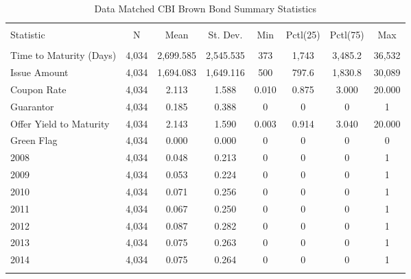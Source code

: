 
\begin{table}[!htbp] \centering 
  \footnotesize
  \caption{Data Matched CBI Brown Bond Summary Statistics} 
  \label{} 
\begin{tabular}{@{\extracolsep{5pt}}lccccccc} 
\\[-1.8ex]\hline 
\hline \\[-1.8ex] 
Statistic & \multicolumn{1}{c}{N} & \multicolumn{1}{c}{Mean} & \multicolumn{1}{c}{St. Dev.} & \multicolumn{1}{c}{Min} & \multicolumn{1}{c}{Pctl(25)} & \multicolumn{1}{c}{Pctl(75)} & \multicolumn{1}{c}{Max} \\ 
\hline \\[-1.8ex] 
Time to Maturity (Days) & 4,034 & 2,699.585 & 2,545.535 & 373 & 1,743 & 3,485.2 & 36,532 \\ 
Issue Amount & 4,034 & 1,694.083 & 1,649.116 & 500 & 797.6 & 1,830.8 & 30,089 \\ 
Coupon Rate & 4,034 & 2.113 & 1.588 & 0.010 & 0.875 & 3.000 & 20.000 \\ 
Guarantor & 4,034 & 0.185 & 0.388 & 0 & 0 & 0 & 1 \\ 
Offer Yield to Maturity & 4,034 & 2.143 & 1.590 & 0.003 & 0.914 & 3.040 & 20.000 \\
Green Flag & 4,034 & 0.000 & 0.000 & 0 & 0 & 0 & 0 \\ 
2008 & 4,034 & 0.048 & 0.213 & 0 & 0 & 0 & 1 \\ 
2009 & 4,034 & 0.053 & 0.224 & 0 & 0 & 0 & 1 \\ 
2010 & 4,034 & 0.071 & 0.256 & 0 & 0 & 0 & 1 \\ 
2011 & 4,034 & 0.067 & 0.250 & 0 & 0 & 0 & 1 \\ 
2012 & 4,034 & 0.087 & 0.282 & 0 & 0 & 0 & 1 \\ 
2013 & 4,034 & 0.075 & 0.263 & 0 & 0 & 0 & 1 \\ 
2014 & 4,034 & 0.075 & 0.264 & 0 & 0 & 0 & 1 \\ 
\hline \\[-1.8ex] 
\end{tabular} 
\end{table} 

\newpage

